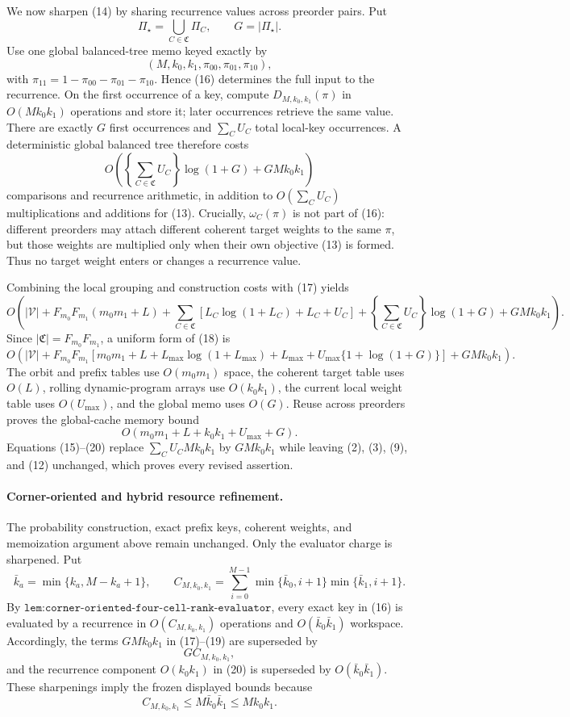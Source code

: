 We now sharpen (14) by sharing recurrence values across preorder pairs. Put
\[
\Pi_\star=\bigcup_{C\in\mathfrak C}\Pi_C,\qquad G=|\Pi_\star|. \tag{15}
\]
Use one global balanced-tree memo keyed exactly by
\[
(M,k_0,k_1,\pi_{00},\pi_{01},\pi_{10}), \tag{16}
\]
with \(\pi_{11}=1-\pi_{00}-\pi_{01}-\pi_{10}\). Hence (16) determines the full input to the recurrence. On the first occurrence of a key, compute \(D_{M,k_0,k_1}(\pi)\) in \(O(Mk_0k_1)\) operations and store it; later occurrences retrieve the same value. There are exactly \(G\) first occurrences and \(\sum_CU_C\) total local-key occurrences. A deterministic global balanced tree therefore costs
\[
O\!\left(\left\{\sum_{C\in\mathfrak C}U_C\right\}\log(1+G)+GMk_0k_1\right) \tag{17}
\]
comparisons and recurrence arithmetic, in addition to \(O(\sum_CU_C)\) multiplications and additions for (13). Crucially, \(\omega_C(\pi)\) is not part of (16): different preorders may attach different coherent target weights to the same \(\pi\), but those weights are multiplied only when their own objective (13) is formed. Thus no target weight enters or changes a recurrence value.

Combining the local grouping and construction costs with (17) yields
\[
O\!\left(
|\mathcal V|+F_{m_0}F_{m_1}(m_0m_1+L)
+\sum_{C\in\mathfrak C}\left[L_C\log(1+L_C)+L_C+U_C\right]
+\left\{\sum_{C\in\mathfrak C}U_C\right\}\log(1+G)+GMk_0k_1
\right). \tag{18}
\]
Since \(|\mathfrak C|=F_{m_0}F_{m_1}\), a uniform form of (18) is
\[
O\!\left(
|\mathcal V|+F_{m_0}F_{m_1}\left[m_0m_1+L+L_{\max}\log(1+L_{\max})+L_{\max}+U_{\max}\{1+\log(1+G)\}\right]+GMk_0k_1
\right). \tag{19}
\]
The orbit and prefix tables use \(O(m_0m_1)\) space, the coherent target table uses \(O(L)\), rolling dynamic-program arrays use \(O(k_0k_1)\), the current local weight table uses \(O(U_{\max})\), and the global memo uses \(O(G)\). Reuse across preorders proves the global-cache memory bound
\[
O(m_0m_1+L+k_0k_1+U_{\max}+G). \tag{20}
\]
Equations (15)--(20) replace \(\sum_CU_CMk_0k_1\) by \(GMk_0k_1\) while leaving (2), (3), (9), and (12) unchanged, which proves every revised assertion.
\paragraph{Corner-oriented and hybrid resource refinement.}
The probability construction, exact prefix keys, coherent weights, and memoization argument above remain unchanged. Only the evaluator charge is sharpened. Put
\[
\bar k_a=\min\{k_a,M-k_a+1\},\qquad
C_{M,k_0,k_1}=
\sum_{i=0}^{M-1}
\min\{\bar k_0,i+1\}\min\{\bar k_1,i+1\}. \tag{21}
\]
By \(\texttt{lem:corner-oriented-four-cell-rank-evaluator}\), every exact key in (16) is evaluated by a recurrence in \(O(C_{M,k_0,k_1})\) operations and \(O(\bar k_0\bar k_1)\) workspace. Accordingly, the terms \(GMk_0k_1\) in (17)--(19) are superseded by
\[
G C_{M,k_0,k_1}, \tag{22}
\]
and the recurrence component \(O(k_0k_1)\) in (20) is superseded by \(O(\bar k_0\bar k_1)\). These sharpenings imply the frozen displayed bounds because
\[
C_{M,k_0,k_1}\le M\bar k_0\bar k_1\le Mk_0k_1. \tag{23}
\]

